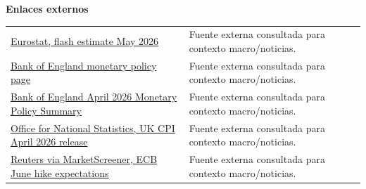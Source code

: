 \documentclass[11pt,a4paper]{article}
\begin{document}
\vspace{0.45em}
\textbf{Enlaces externos}\par
\begin{tabularx}{\textwidth}{p{7.4cm}X}
\href{\detokenize{https://ec.europa.eu/eurostat/en/web/products-euro-indicators/w/2-02062026-ap}}{Eurostat, flash estimate May 2026} & Fuente externa consultada para contexto macro/noticias. \\
\href{\detokenize{https://www.bankofengland.co.uk/monetary-policy}}{Bank of England monetary policy page} & Fuente externa consultada para contexto macro/noticias. \\
\href{\detokenize{https://www.bankofengland.co.uk/monetary-policy-summary-and-minutes/2026/april-2026}}{Bank of England April 2026 Monetary Policy Summary} & Fuente externa consultada para contexto macro/noticias. \\
\href{\detokenize{https://www.ons.gov.uk/releases/consumerpriceinflationukapril2026}}{Office for National Statistics, UK CPI April 2026 release} & Fuente externa consultada para contexto macro/noticias. \\
\href{\detokenize{https://www.marketscreener.com/news/ecb-june-rate-hike-case-is-nearly-sealed-but-july-is-fully-open-sources-say-ce7f5ad9da8eff20}}{Reuters via MarketScreener, ECB June hike expectations} & Fuente externa consultada para contexto macro/noticias. \\
\end{tabularx}
\end{document}
